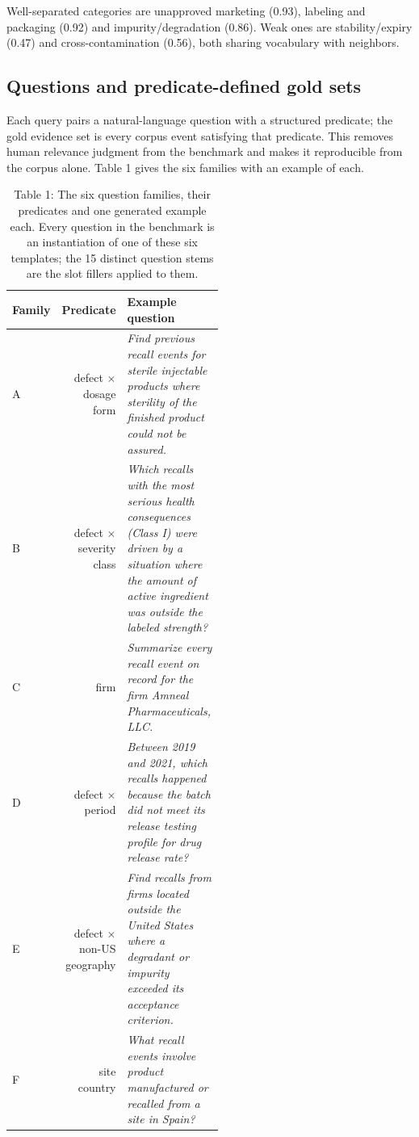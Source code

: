 \documentclass[runningheads]{llncs}
\begin{document}
Well-separated categories are unapproved marketing (0.93), labeling and packaging (0.92) and impurity/degradation (0.86). Weak ones are stability/expiry (0.47) and cross-contamination (0.56), both sharing vocabulary with neighbors.


\subsection{Questions and predicate-defined gold sets}
Each query pairs a natural-language question with a structured predicate; the gold evidence set is every corpus event satisfying that predicate. This removes human relevance judgment from the benchmark and makes it reproducible from the corpus alone. Table 1 gives the six families with an example of each.


\begin{table}[t]
\centering
\small
\caption{Table 1: The six question families, their predicates and one generated example each. Every question in the benchmark is an instantiation of one of these six templates; the 15 distinct question stems are the slot fillers applied to them.}
\begin{tabular}{lrp{0.52\linewidth}}
\toprule
Family & Predicate & Example question \\
\midrule
A & defect $\times$ dosage form & \textit{Find previous recall events for sterile injectable products where sterility of the finished product could not be assured.} \\
B & defect $\times$ severity class & \textit{Which recalls with the most serious health consequences (Class I) were driven by a situation where the amount of active ingredient was outside the labeled strength?} \\
C & firm & \textit{Summarize every recall event on record for the firm Amneal Pharmaceuticals, LLC.} \\
D & defect $\times$ period & \textit{Between 2019 and 2021, which recalls happened because the batch did not meet its release testing profile for drug release rate?} \\
E & defect $\times$ non-US geography & \textit{Find recalls from firms located outside the United States where a degradant or impurity exceeded its acceptance criterion.} \\
F & site country & \textit{What recall events involve product manufactured or recalled from a site in Spain?} \\
\bottomrule
\end{tabular}
\end{table}
\end{document}
